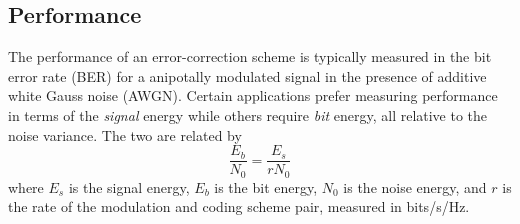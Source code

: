\subsection{Performance}
\label{module:fec:performance}
The performance of an error-correction scheme is typically measured in
the bit error rate (BER) for a anipotally modulated signal in the
presence of additive white Gauss noise (AWGN).
Certain applications prefer measuring performance in terms of the
{\em signal} energy while others require {\em bit} energy,
all relative to the noise variance.
The two are related by
%
\begin{equation}
\label{eqn:fec:esn0_ebn0}
    \frac{E_b}{N_0} = \frac{E_s}{r N_0}
\end{equation}
%
where
$E_s$ is the signal energy,
$E_b$ is the bit energy,
$N_0$ is the noise energy,
and
$r$ is the rate of the modulation and coding scheme pair,
measured in bits/s/Hz.
%
